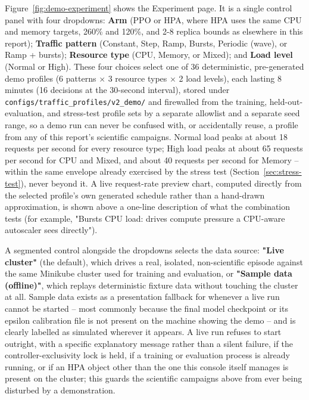Figure~\ref{fig:demo-experiment} shows the Experiment page. It is a single
control panel with four dropdowns: \textbf{Arm} (PPO or HPA, where HPA uses
the same CPU and memory targets, 260\% and 120\%, and 2-8 replica bounds as
elsewhere in this report); \textbf{Traffic pattern} (Constant, Step, Ramp,
Bursts, Periodic (wave), or Ramp + bursts); \textbf{Resource type} (CPU,
Memory, or Mixed); and \textbf{Load level} (Normal or High). These four
choices select one of 36 deterministic, pre-generated demo profiles
(6 patterns $\times$ 3 resource types $\times$ 2 load levels), each lasting
8 minutes (16 decisions at the 30-second interval), stored under
\texttt{configs/\allowbreak \allowbreak traffic\_\allowbreak profiles/\allowbreak \allowbreak v2\_\allowbreak demo/\allowbreak \allowbreak } and firewalled from
the training, held-out-evaluation, and stress-test profile sets by a
separate allowlist and a separate seed range, so a demo run can never be
confused with, or accidentally reuse, a profile from any of this report's
scientific campaigns. Normal load peaks at about 18 requests per second for
every resource type; High load peaks at about 65 requests per second for
CPU and Mixed, and about 40 requests per second for Memory -- within the
same envelope already exercised by the stress test (Section~\ref{sec:stress-test}),
never beyond it. A live request-rate preview chart, computed directly from
the selected profile's own generated schedule rather than a hand-drawn
approximation, is shown above a one-line description of what the
combination tests (for example, "Bursts CPU load: drives compute pressure a
CPU-aware autoscaler sees directly").

A segmented control alongside the dropdowns selects the data source:
\textbf{"Live cluster"} (the default), which drives a real, isolated,
non-scientific episode against the same Minikube cluster used for training
and evaluation, or \textbf{"Sample data (offline)"}, which replays
deterministic fixture data without touching the cluster at all. Sample data
exists as a presentation fallback for whenever a live run cannot be
started -- most commonly because the final model checkpoint or its epsilon
calibration file is not present on the machine showing the demo -- and is
clearly labelled as simulated wherever it appears. A live run refuses to
start outright, with a specific explanatory message rather than a silent
failure, if the controller-exclusivity lock is held, if a training or
evaluation process is already running, or if an HPA object other than the
one this console itself manages is present on the cluster; this guards the
scientific campaigns above from ever being disturbed by a demonstration.

